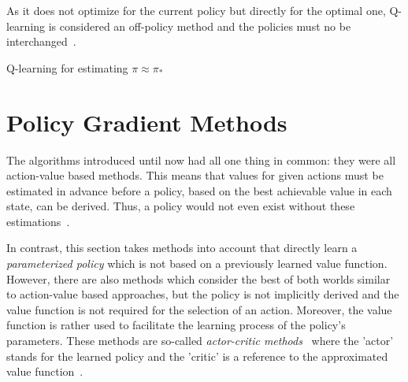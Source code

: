 \documentclass[draft,final]{vutinfth} %
\newcommand{\p}[1]{see p. #1}
\begin{document}
    As it does not optimize for the current policy but directly for the optimal one, Q-learning is considered an off-policy method and the policies must no be interchanged~\citep[\p{57}]{szepesvari_algorithms_2010}.

    \begin{algorithm}
        \caption[Q-learning for estimating $\pi \approx \pi_*$]{Q-learning for estimating $\pi \approx \pi_*$\protect\footnotemark}
        \label{alg:q_learning}

        \KwIn{Step size $\alpha \in (0,1]$, small $\epsilon > 0$}
        \;



    \end{algorithm}

    \footnotetext{\citep[\p{131}]{sutton_reinforcement_2018}}


    \section{Policy Gradient Methods}\label{sec:policy-gradient-methods}
    The algorithms introduced until now had all one thing in common: they were all action-value based methods.
    This means that values for given actions must be estimated in advance before a policy, based on the best achievable value in each state, can be derived.
    Thus, a policy would not even exist without these estimations~\citep[\p{321}]{sutton_reinforcement_2018}.

    In contrast, this section takes methods into account that directly learn a \textit{parameterized policy} which is not based on a previously learned value function.
    However, there are also methods which consider the best of both worlds similar to action-value based approaches, but the policy is not implicitly derived and the value function is not required for the selection of an action.
    Moreover, the value function is rather used to facilitate the learning process of the policy's parameters.
    These methods are so-called \textit{actor-critic methods}~ where the 'actor' stands for the learned policy and the 'critic' is a reference to the approximated value function~\citep[\p{321}]{sutton_reinforcement_2018}.
\end{document}
